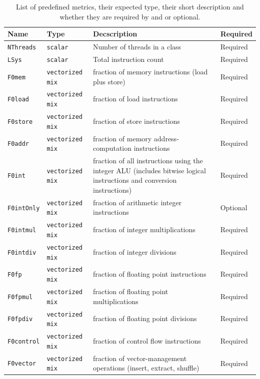 \documentclass[a4paper, 10pt]{article}
\begin{document}
  \begin{table}[t!]
\centering
\scriptsize
\caption{List of predefined \ex metrics, their expected type, their short description and whether they are required by \ex and \eb or optional.}
\begin{tabular}{|p{3.8cm} | p{1.5cm} ||p{7.6cm}| p{1.7cm} |}
\hline
\textbf{Name} &\textbf{Type} & \textbf{Decscription} & \textbf{Required} \\
\hline
\hline
\texttt{NThreads} &\texttt{scalar} & Number of threads in a class & Required \\
\hline
\texttt{LSys} &\texttt{scalar} & Total instruction count & Required \\
\hline
\texttt{F0mem} &\texttt{vectorized mix} & fraction of memory instructions (load plus store) & Required \\
\hline
\texttt{F0load} &\texttt{vectorized mix} & fraction of load instructions & Required \\
\hline
\texttt{F0store} &\texttt{vectorized mix} & fraction of store instructions & Required \\
\hline
\texttt{F0addr} &\texttt{vectorized mix} & fraction of memory address-computation instructions & Required \\
\hline
\texttt{F0int} &\texttt{vectorized mix} & fraction of all instructions using the integer ALU (includes bitwise logical instructions and conversion instructions) & Required \\
\hline
\texttt{F0intOnly} &\texttt{vectorized mix} & fraction of arithmetic integer instructions & Optional \\
\hline
\texttt{F0intmul} &\texttt{vectorized mix} & fraction of integer multiplications & Required \\
\hline
\texttt{F0intdiv} &\texttt{vectorized mix} & fraction of integer divisions & Required \\
\hline
\texttt{F0fp} &\texttt{vectorized mix} & fraction of floating point instructions & Required \\
\hline
\texttt{F0fpmul} &\texttt{vectorized mix} & fraction of floating point multiplications & Required \\
\hline
\texttt{F0fpdiv} &\texttt{vectorized mix} & fraction of floating point divisions & Required \\
\hline
\texttt{F0control} &\texttt{vectorized mix} & fraction of control flow instructions & Required \\
\hline
\texttt{F0vector} &\texttt{vectorized mix} & fraction of vector-management operations (insert, extract, shuffle) & Required \\

\end{tabular}
\end{table}
\end{document}
